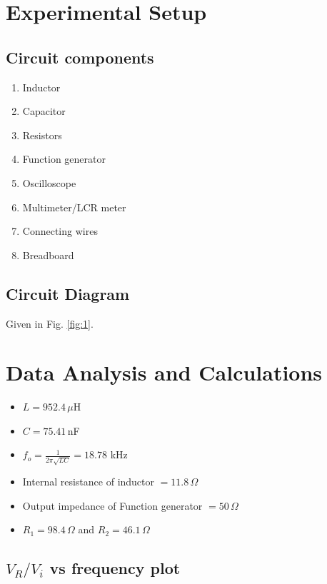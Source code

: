\section{Experimental Setup}

\subsection*{Circuit components}
    \begin{enumerate}
        \item Inductor
        \item Capacitor
        \item Resistors
        \item Function generator
        \item Oscilloscope
        \item Multimeter/LCR meter
        \item Connecting wires
        \item Breadboard
    \end{enumerate}

    \subsection*{Circuit Diagram}
    Given in Fig. \ref{fig:1}.

\section{Data Analysis and Calculations}

\begin{itemize}
    \item $L=952.4\,\mu$H 
    \item $C=75.41\,$nF
    \item $f_o=\frac{1}{2\pi\sqrt{LC}}=18.78$ kHz
    \item Internal resistance of inductor $= 11.8\,\Omega$
    \item Output impedance of Function generator $= 50\,\Omega$
    \item $R_1=98.4\,\Omega$ and $R_2=46.1\,\Omega$
\end{itemize}

    \subsection{$V_R/V_i$ vs frequency plot}

